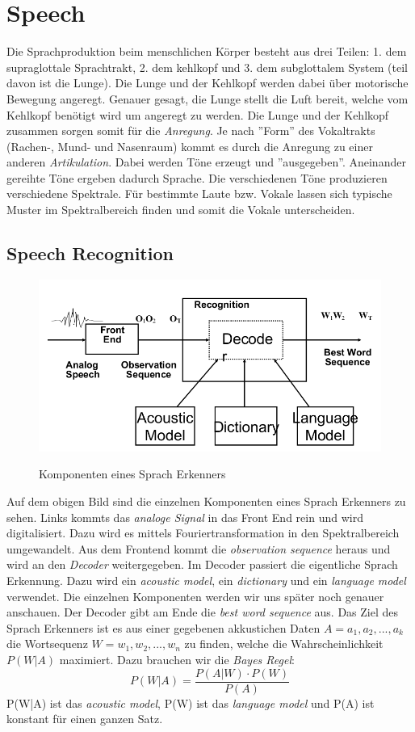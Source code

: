 \section{Speech}
\label{sect:speech}
Die Sprachproduktion beim menschlichen Körper besteht aus drei Teilen: 1. dem supraglottale Sprachtrakt, 2. dem kehlkopf und 3. dem subglottalem System (teil davon ist die Lunge). Die Lunge und der Kehlkopf werden dabei über motorische Bewegung angeregt. Genauer gesagt, die Lunge stellt die Luft bereit, welche vom Kehlkopf benötigt wird um angeregt zu werden. Die Lunge und der Kehlkopf zusammen sorgen somit für die \textit{Anregung}.
Je nach ''Form'' des Vokaltrakts (Rachen-, Mund- und Nasenraum) kommt es durch die Anregung zu einer anderen \textit{Artikulation}. Dabei werden Töne erzeugt und ''ausgegeben''. Aneinander gereihte Töne ergeben dadurch Sprache.
Die verschiedenen Töne produzieren verschiedene Spektrale. Für bestimmte Laute bzw. Vokale lassen sich typische Muster im Spektralbereich finden und somit die Vokale unterscheiden.

\subsection{Speech Recognition}
\label{ssect:speech-recognition}
\begin{figure}[h]
\centering
\includegraphics[scale=0.45]{komponenten-speech-recognition}
\label{graph:komponenten-speech-recognition}
\caption{Komponenten eines Sprach Erkenners}
\end{figure}
Auf dem obigen Bild sind die einzelnen Komponenten eines Sprach Erkenners zu sehen. Links kommts das \textit{analoge Signal} in das Front End rein und wird digitalisiert. Dazu wird es mittels Fouriertransformation in den Spektralbereich umgewandelt. Aus dem Frontend kommt die \textit{observation sequence} heraus und wird an den \textit{Decoder} weitergegeben. Im Decoder passiert die eigentliche Sprach Erkennung. Dazu wird ein \textit{acoustic model}, ein \textit{dictionary} und ein \textit{language model} verwendet. Die einzelnen Komponenten werden wir uns später noch genauer anschauen. Der Decoder gibt am Ende die \textit{best word sequence} aus.
Das Ziel des Sprach Erkenners ist es aus einer gegebenen akkustichen Daten $A = a_1, a_2, ..., a_k$ die Wortsequenz $W = w_1, w_2, ..., w_n$ zu finden, welche die Wahrscheinlichkeit $P(W|A)$ maximiert. Dazu brauchen wir die \textit{Bayes Regel}:
\[
P(W|A) = \frac{P(A|W) \cdot P(W)}{P(A)}
\]
P(W|A) ist das \textit{acoustic model}, P(W) ist das \textit{language model} und P(A) ist konstant für einen ganzen Satz.

